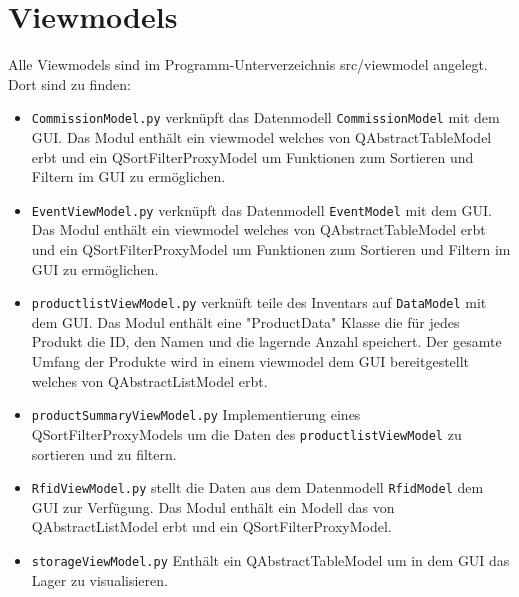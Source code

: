 \section*{Viewmodels}
Alle Viewmodels sind im Programm-Unterverzeichnis \glqq src/viewmodel \grqq angelegt. Dort sind zu finden: 
\begin{itemize}
    \item \verb|CommissionModel.py| verknüpft das Datenmodell \verb|CommissionModel| mit dem GUI. Das Modul enthält ein viewmodel welches von QAbstractTableModel erbt und ein QSortFilterProxyModel um Funktionen zum Sortieren und Filtern im GUI zu ermöglichen.
    \item \verb|EventViewModel.py| verknüpft das Datenmodell \verb|EventModel| mit dem GUI. Das Modul enthält ein viewmodel welches von QAbstractTableModel erbt und ein QSortFilterProxyModel um Funktionen zum Sortieren und Filtern im GUI zu ermöglichen.
    \item \verb|productlistViewModel.py| verknüft teile des Inventars auf \verb|DataModel| mit dem GUI. Das Modul enthält eine "ProductData" Klasse die für jedes Produkt die ID, den Namen und die lagernde Anzahl speichert. Der gesamte Umfang der Produkte wird in einem viewmodel dem GUI bereitgestellt welches von QAbstractListModel erbt. 
    \item \verb|productSummaryViewModel.py| Implementierung eines QSortFilterProxyModels um die Daten des \verb|productlistViewModel| zu sortieren und zu filtern.
    \item \verb|RfidViewModel.py| stellt die Daten aus dem Datenmodell \verb|RfidModel| dem GUI zur Verfügung. Das Modul enthält ein Modell das von QAbstractListModel erbt und ein QSortFilterProxyModel.
    \item \verb|storageViewModel.py| Enthält ein QAbstractTableModel um in dem GUI das Lager zu visualisieren. 
\end{itemize}
